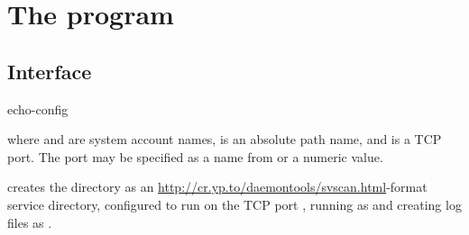 
\chapter{The  program}

\section{Interface}
\begin{code}
  echo-config    
\end{code}
where  and  are system account names,
 is an absolute path name, and  is a TCP port.
The port may be specified as a name from  or a
numeric value.

 creates the directory  as an
\href{svscan}{http://cr.yp.to/daemontools/svscan.html}-format service
directory, configured to run  on the TCP port
, running  as  and creating log
files as .



